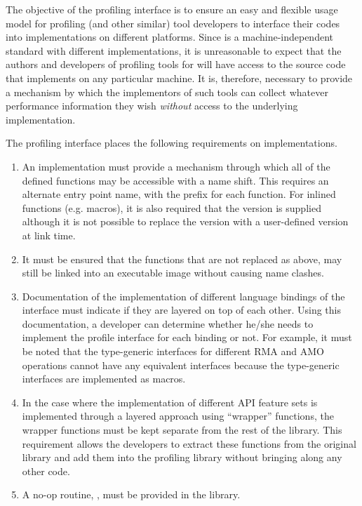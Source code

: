 The objective of the \openshmem profiling interface is to ensure an 
easy and flexible usage model for profiling (and other similar) 
tool developers to interface their codes into \openshmem 
implementations on different platforms. Since \openshmem is a 
machine-independent standard with different implementations, it is 
unreasonable to expect that the authors and developers of profiling 
tools for \openshmem will have access to the source code that 
implements \openshmem on any particular machine. It is, therefore,  
necessary to provide a mechanism by which the implementors of such 
tools can collect whatever performance information they wish 
\textit{without} access to the underlying implementation.

The \openshmem profiling interface places the following requirements 
on implementations. 

\begin{enumerate}
\item An \openshmem implementation must provide a mechanism through 
which all of the \openshmem defined functions may be accessible 
with a name shift. This requires an alternate 
entry point name, with the prefix  for each 
\openshmem function. For \openshmem inlined functions (e.g. macros), 
it is also required that the  version is supplied 
although it is not possible to replace the  version 
with a user-defined version at link time.
\item It must be ensured that the \openshmem functions that are not 
replaced as above, may still be linked into an executable image 
without causing name clashes. 
\item Documentation of the implementation of different language 
bindings of the \openshmem interface must indicate if they 
are layered on top of each other. Using this documentation, a  
developer can determine whether he/she needs to implement the 
profile interface for each binding or not. For example, it must 
be noted that the \openshmem \Cstd[11] type-generic interfaces for 
different RMA and AMO operations cannot have any equivalent 
 interfaces because the \Cstd[11] type-generic 
interfaces are implemented as macros.
\item In the case where the implementation of different API  
feature sets is implemented through a layered approach using 
``wrapper'' functions, the wrapper functions must be kept separate 
from the rest of the library. This requirement allows the developers 
to extract these functions from the original \openshmem library 
and add them into the profiling library without bringing along any 
other code.
\item A no-op routine, , must be provided 
in the \openshmem library.
\end{enumerate}


